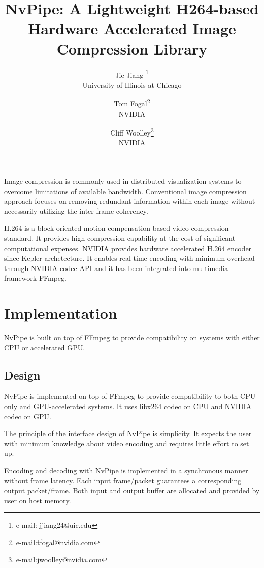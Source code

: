 \documentclass{vgtc}                          %
\title{NvPipe: A Lightweight H264-based Hardware Accelerated Image Compression Library}
\author{Jie Jiang \thanks{e-mail: jjiang24@uic.edu}\\ %
        \scriptsize University of Illinois at Chicago %
\and Tom Fogal\thanks{e-mail:tfogal@nvidia.com}\\ %
     \scriptsize NVIDIA %
\and Cliff Woolley\thanks{e-mail:jwoolley@nvidia.com}\\ %
     \scriptsize NVIDIA}
\begin{document}


\maketitle

Image compression is commonly used in distributed visualization systems to overcome limitations of available bandwidth. Conventional image compression approach focuses on removing redundant information within each image without necessarily utilizing the inter-frame coherency.

H.264 is a block-oriented motion-compensation-based video compression standard. It provides high compression capability at the cost of significant computational expenses. NVIDIA provides hardware accelerated H.264 encoder since Kepler archetecture. It enables real-time encoding with minimum overhead through NVIDIA codec API and it has been integrated into multimedia framework FFmpeg. 

\section{Implementation}

NvPipe is built on top of FFmpeg to provide compatibility on systems with either CPU or accelerated GPU.

\subsection{Design}

NvPipe is implemented on top of FFmpeg to provide compatibility to both CPU-only and GPU-accelerated systems. It uses libx264 codec on CPU and NVIDIA codec on GPU. 

The principle of the interface design of NvPipe is simplicity. It expects the user with minimum knowledge about video encoding and requires little effort to set up.

Encoding and decoding with NvPipe is implemented in a synchronous manner without frame latency. Each input frame/packet guarantees a corresponding output packet/frame. Both input and output buffer are allocated and provided by user on host memory.
\end{document}
